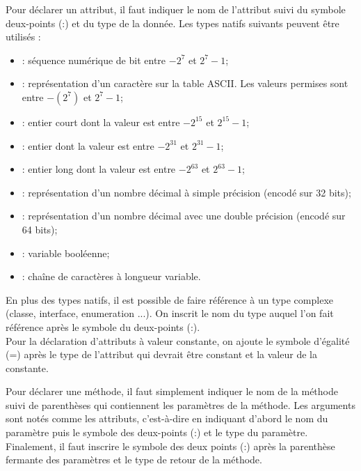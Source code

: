 Pour déclarer un \gls{attribut}, il faut indiquer le nom de l'\gls{attribut} suivi du symbole deux-points (:) et du type de la donnée. Les types natifs suivants peuvent être utilisés :

\begin{itemize}
	\item {} : séquence numérique de bit entre $-2^7$ et $2^7-1$;
	\item {} : représentation d'un caractère sur la table ASCII. Les valeurs permises sont entre $-(2^7)$ et $2^7-1$;
	\item {} : entier court dont la valeur est entre $-2^{15}$ et $2^{15}-1$; 
	\item {} : entier dont la valeur est entre $-2^{31}$ et $2^{31}-1$;
	\item {} : entier long dont la valeur est entre $-2^{63}$ et $2^{63}-1$;
	\item {} : représentation d'un nombre décimal à simple précision (encodé sur 32 bits);
	\item {} : représentation d'un nombre décimal avec une double précision (encodé sur 64 bits);
	\item {} : variable booléenne;
	\item {} : chaîne de caractères à longueur variable.
\end{itemize}

En plus des types natifs, il est possible de faire référence à un type complexe (\gls{classe}, \gls{interface}, \gls{enumeration} ...). On inscrit le nom du type auquel l'on fait référence après le symbole du deux-points (:).\\

Pour la déclaration d'attributs à valeur constante, on ajoute le symbole d'égalité (=) après le type de l'attribut qui devrait être constant et la valeur de la constante.

Pour déclarer une méthode, il faut simplement indiquer le nom de la méthode suivi de parenthèses qui contiennent les paramètres de la méthode. Les arguments sont notés comme les \glspl{attribut}, c'est-à-dire en indiquant d'abord le nom du paramètre puis le symbole des deux-points ({\NoAutoSpacing  :}) et le type du paramètre. Finalement, il faut inscrire le symbole des deux points ({\NoAutoSpacing  :}) après la parenthèse fermante des paramètres et le type de retour de la méthode.\\


